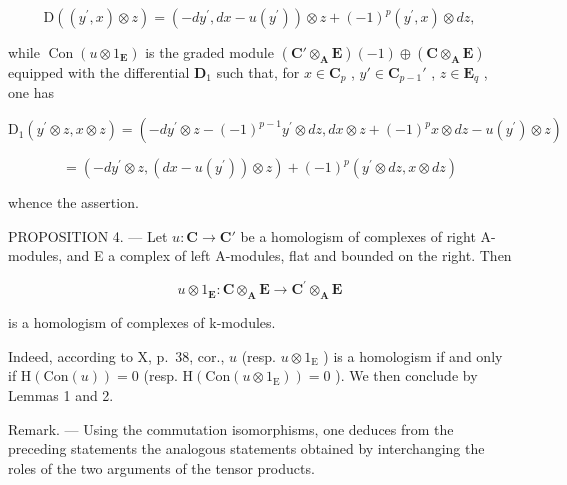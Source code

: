 \[
\mathrm{D} ((y ^ {\prime}, x) \otimes z) = (- d y ^ {\prime}, d x - u (y ^ {\prime})) \otimes z + (- 1) ^ {p} (y ^ {\prime}, x) \otimes d z,\tag{4}
\]

while \(\operatorname{Con}(u \otimes 1_{\mathbf{E}})\) is the graded module \((\mathbf{C}' \otimes_{\mathbf{A}} \mathbf{E})(-1) \oplus (\mathbf{C} \otimes_{\mathbf{A}} \mathbf{E})\) equipped with the differential \(\mathbf{D}_1\) such that, for \(x \in \mathbf{C}_p\) , \(y' \in \mathbf{C}_{p-1}'\) , \(z \in \mathbf{E}_q\) , one has

\[
\mathrm{D} _ {1} \left(y ^ {\prime} \otimes z, x \otimes z\right) = (- d y ^ {\prime} \otimes z - (- 1) ^ {p - 1} y ^ {\prime} \otimes d z, d x \otimes z + (- 1) ^ {p} x \otimes d z - u \left(y ^ {\prime}\right) \otimes z)
\]

\[
= \left(- d y ^ {\prime} \otimes z, (d x - u (y ^ {\prime})) \otimes z\right) + (- 1) ^ {p} \left(y ^ {\prime} \otimes d z, x \otimes d z\right)
\]

whence the assertion.

PROPOSITION 4. — Let \(u: \mathbf{C} \to \mathbf{C}'\) be a homologism of complexes of right A-modules, and E a complex of left A-modules, flat and bounded on the right. Then

\[
u \otimes 1 _ {\mathbf {E}}: \mathbf {C} \otimes_ {\mathbf {A}} \mathbf {E} \rightarrow \mathbf {C} ^ {\prime} \otimes_ {\mathbf {A}} \mathbf {E}
\]

is a homologism of complexes of k-modules.

Indeed, according to X, p.~38, cor., \(u\) (resp. \(u \otimes 1_{\mathrm{E}}\) ) is a homologism if and only if \(\mathrm{H}(\mathrm{Con}(u)) = 0\) (resp. \(\mathrm{H}(\mathrm{Con}(u \otimes 1_{\mathrm{E}})) = 0\) ). We then conclude by Lemmas 1 and 2.

Remark. --- Using the commutation isomorphisms, one deduces from the preceding statements the analogous statements obtained by interchanging the roles of the two arguments of the tensor products.

